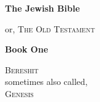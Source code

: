 \documentclass[a4paper,11pt]{report}
\begin{document}
\begin{titlepage}
    \begin{center}
        \vspace*{1cm}
 
        {\Huge  \textbf{The Jewish Bible}}
 
        \vspace{0.5cm}
        {or, \textsc{The Old Testament}}
        
                   
        \vspace{1.5cm}
        
        {\textbf{Book One}}

        \vspace{1.5cm}

        \vspace{0.5cm}
        {\textsc{Bereshit}\\
        sometimes also called,\\
        \textsc{Genesis}}

        \vspace{0.5cm}

        \vfill
    \end{center}
 \end{titlepage}

\tableofcontents




\end{document}
